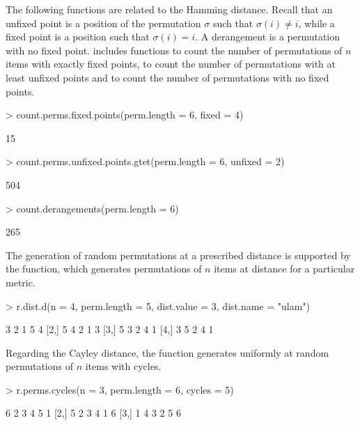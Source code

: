 \documentclass[article,nojss]{jss}
\begin{document}
The following functions are related to the Hamming distance. Recall that an unfixed point is  a position of the permutation $\sigma$ such that $\sigma(i) \neq i$, while a fixed point is a position such that  $\sigma(i) =i$. A derangement is a permutation with no fixed point.  includes functions to count the number of permutations of $n$ items with exactly  fixed points, to count the number of permutations with at least  unfixed points and to count the number of permutations with no fixed points. 
\begin{Schunk}
\begin{Sinput}
> count.perms.fixed.points(perm.length = 6, fixed = 4)
\end{Sinput}
\begin{Soutput}
[1] 15
\end{Soutput}
\begin{Sinput}
> count.perms.unfixed.points.gtet(perm.length = 6, unfixed = 2)
\end{Sinput}
\begin{Soutput}
[1] 504
\end{Soutput}
\begin{Sinput}
> count.derangements(perm.length = 6)
\end{Sinput}
\begin{Soutput}
[1] 265
\end{Soutput}
\end{Schunk}

The generation of random permutations at a prescribed distance is supported by the  function, which generates  permutations of $n$ items at distance  for a particular metric.
\begin{Schunk}
\begin{Sinput}
> r.dist.d(n = 4, perm.length = 5, dist.value = 3, dist.name = "ulam")
\end{Sinput}
\begin{Soutput}
     [,1] [,2] [,3] [,4] [,5]
[1,]    3    2    1    5    4
[2,]    5    4    2    1    3
[3,]    5    3    2    4    1
[4,]    3    5    2    4    1
\end{Soutput}
\end{Schunk}

Regarding the Cayley distance, the  function generates uniformly at random permutations of $n$ items with  cycles. 
\begin{Schunk}
\begin{Sinput}
> r.perms.cycles(n = 3, perm.length = 6, cycles = 5)
\end{Sinput}
\begin{Soutput}
     [,1] [,2] [,3] [,4] [,5] [,6]
[1,]    6    2    3    4    5    1
[2,]    5    2    3    4    1    6
[3,]    1    4    3    2    5    6
\end{Soutput}
\end{Schunk}
\end{document}
